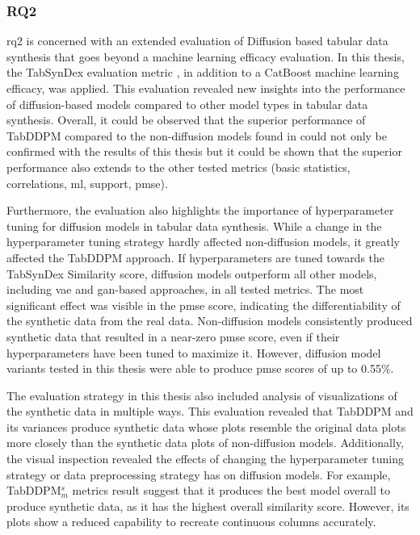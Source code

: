 \subsubsection{RQ2}
\gls{rq}2 is concerned with an extended evaluation of Diffusion based tabular data synthesis that goes beyond a machine learning efficacy evaluation.
In this thesis, the TabSynDex evaluation metric \cite{chundawat2022UniversalMetricRobust}, in addition to a CatBoost machine learning efficacy, was applied.
This evaluation revealed new insights into the performance of diffusion-based models compared to other model types in tabular data synthesis.
Overall, it could be observed that the superior performance of TabDDPM compared to the non-diffusion models found in \cite{kotelnikov2022TabDDPMModellingTabular}
could not only be confirmed with the results of this thesis but it could be shown that the superior performance also extends to the other tested metrics (basic statistics, correlations, ml, support, \gls{pmse}).

Furthermore, the evaluation also highlights the importance of hyperparameter tuning for diffusion models in tabular data synthesis.
While a change in the hyperparameter tuning strategy hardly affected non-diffusion models, it greatly affected the TabDDPM approach.
If hyperparameters are tuned towards the TabSynDex Similarity score, diffusion models outperform all other models, including \gls{vae} and \gls{gan}-based approaches,
in all tested metrics.
The most significant effect was visible in the \gls{pmse} score, indicating the differentiability of the synthetic data from the real data.
Non-diffusion models consistently produced synthetic data that resulted in a near-zero \gls{pmse} score, even if their hyperparameters have been tuned to maximize it.
However, diffusion model variants tested in this thesis were able to produce \gls{pmse} scores of up to 0.55\%.

The evaluation strategy in this thesis also included analysis of visualizations of the synthetic data in multiple ways.
This evaluation revealed that TabDDPM and its variances produce synthetic data whose plots resemble the original data plots more closely than the synthetic data plots of non-diffusion models.
Additionally, the visual inspection revealed the effects of changing the hyperparameter tuning strategy or data preprocessing strategy has on diffusion models.
For example, TabDDPM$^{s}_m$ metrics result suggest that it produces the best model overall to produce synthetic data, as it has the highest overall similarity score.
However, its plots show a reduced capability to recreate continuous columns accurately.

